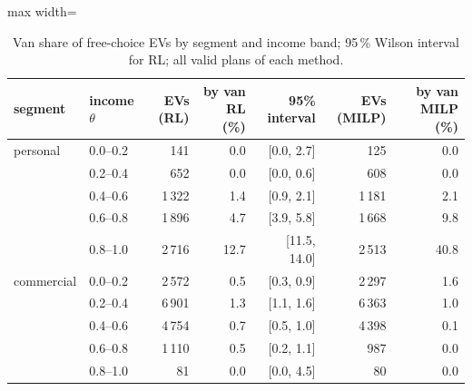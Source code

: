 \begin{table}[H]\centering
\small
\caption{Van share of free-choice EVs by segment and income band; 95\,\% Wilson interval for RL; all valid plans of each method.}\label{tab:vanband}
\begin{adjustbox}{max width=\textwidth}\begin{tabular}{llrrrrr}\toprule
segment & income $\theta$ & EVs (RL) & by van RL (\%) & 95\% interval & EVs (MILP) & by van MILP (\%) \\ \midrule
personal & 0.0--0.2 & 141 & 0.0 & [0.0, 2.7] & 125 & 0.0 \\
 & 0.2--0.4 & 652 & 0.0 & [0.0, 0.6] & 608 & 0.0 \\
 & 0.4--0.6 & 1\,322 & 1.4 & [0.9, 2.1] & 1\,181 & 2.1 \\
 & 0.6--0.8 & 1\,896 & 4.7 & [3.9, 5.8] & 1\,668 & 9.8 \\
 & 0.8--1.0 & 2\,716 & 12.7 & [11.5, 14.0] & 2\,513 & 40.8 \\
commercial & 0.0--0.2 & 2\,572 & 0.5 & [0.3, 0.9] & 2\,297 & 1.6 \\
 & 0.2--0.4 & 6\,901 & 1.3 & [1.1, 1.6] & 6\,363 & 1.0 \\
 & 0.4--0.6 & 4\,754 & 0.7 & [0.5, 1.0] & 4\,398 & 0.1 \\
 & 0.6--0.8 & 1\,110 & 0.5 & [0.2, 1.1] & 987 & 0.0 \\
 & 0.8--1.0 & 81 & 0.0 & [0.0, 4.5] & 80 & 0.0 \\
\bottomrule\end{tabular}\end{adjustbox}\end{table}

